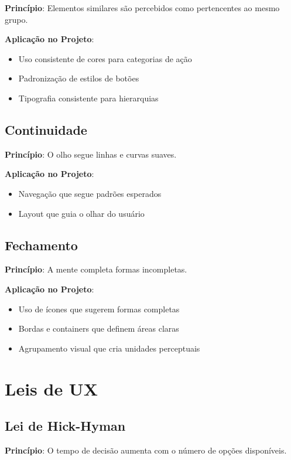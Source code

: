 \textbf{Princípio}: Elementos similares são percebidos como pertencentes ao mesmo grupo.

\textbf{Aplicação no Projeto}:
\begin{itemize}
    \item Uso consistente de cores para categorias de ação
    \item Padronização de estilos de botões
    \item Tipografia consistente para hierarquias
\end{itemize}

\subsection{Continuidade}

\textbf{Princípio}: O olho segue linhas e curvas suaves.

\textbf{Aplicação no Projeto}:
\begin{itemize}
    \item Navegação que segue padrões esperados
    \item Layout que guia o olhar do usuário
\end{itemize}

\subsection{Fechamento}

\textbf{Princípio}: A mente completa formas incompletas.

\textbf{Aplicação no Projeto}:
\begin{itemize}
    \item Uso de ícones que sugerem formas completas
    \item Bordas e containers que definem áreas claras
    \item Agrupamento visual que cria unidades perceptuais
\end{itemize}

\section{Leis de UX}

\subsection{Lei de Hick-Hyman}

\textbf{Princípio}: O tempo de decisão aumenta com o número de opções disponíveis.

